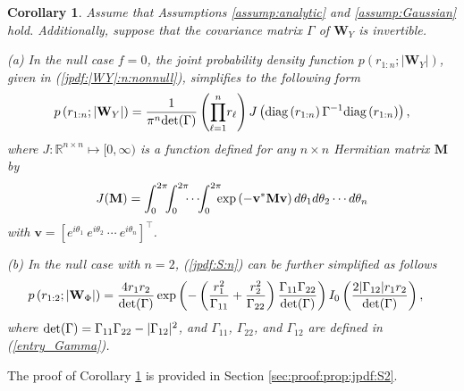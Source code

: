\documentclass{amsart}
\newtheorem{Corollary}{Corollary}
\begin{document}
\begin{Corollary}\label{prop:jpdf:S2}
Assume that Assumptions \ref{assump:analytic} and \ref{assump:Gaussian} hold.
Additionally,
suppose that the covariance matrix $\Gamma$ of $\mathbf{W}_{Y}$
is invertible.


(a) In the null case $f=0$, the joint probability density function $p\left(r_{1:n};|\mathbf{W}_{Y}|\right)$,
given in (\ref{jpdf:|WY|:n:nonnull}),
simplifies to the following form
\begin{align}\label{jpdf:S:n}
p\left(r_{1:n};|\mathbf{W}_{Y}|\right)
=
\frac{1}{\pi^{n}\textup{det}(\Gamma)}\left(\overset{n}{\underset{\ell=1}{\prod}}r_{\ell}\right)
J\left(\textup{diag}\left(r_{1:n}\right)\Gamma^{-1}\textup{diag}\left(r_{1:n}\right)\right),
\end{align}
where $J: \mathbb{R}^{n\times n} \mapsto [0,\infty)$ is a function defined for any $n\times n$ Hermitian matrix $\mathbf{M}$ by
\begin{align}\label{def:functionB}
J(\mathbf{M}) = \int_{0}^{2\pi}\hspace{-0.15cm}\int_{0}^{2\pi}\hspace{-0.17cm}\cdots \hspace{-0.12cm}\int_{0}^{2\pi}\hspace{-0.2cm} \exp
\left(-\mathbf{v}^{*}\mathbf{M}\mathbf{v}\right)d\theta_{1}d\theta_{2}\cdots d\theta_{n}
\end{align}
with $\mathbf{v}= [e^{i\theta_{1}} \ e^{i\theta_{2}} \ \cdots \ e^{i\theta_{n}}]^{\top}$.


(b) In the null case with $n=2$,
(\ref{jpdf:S:n})
can be further
simplified as follows
\begin{align}\label{jpdf:|WY|:n=2:null}
&p\left(r_{1:2};|\mathbf{W}_{\Phi}|\right)
=\frac{4r_{1}r_{2}}{\textup{det}(\Gamma)}
\exp\left(-\left(\frac{r_{1}^2}{\Gamma_{11}}+\frac{r_{2}^2}{\Gamma_{22}}\right)
\frac{\Gamma_{11}\Gamma_{22}}{\textup{det}(\Gamma)}\right)
 I_{0}\left(
\frac{2|\Gamma_{12}|r_{1}r_{2}} {\textup{det}(\Gamma)}\right),
\end{align}
where $\textup{det}(\Gamma)=\Gamma_{11}\Gamma_{22}-|\Gamma_{12}|^2$, and
$\Gamma_{11}$, $\Gamma_{22}$, and $\Gamma_{12}$ are defined in (\ref{entry_Gamma}).
\end{Corollary}
The proof of Corollary \ref{prop:jpdf:S2} is provided in Section \ref{sec:proof:prop:jpdf:S2}.
\end{document}
